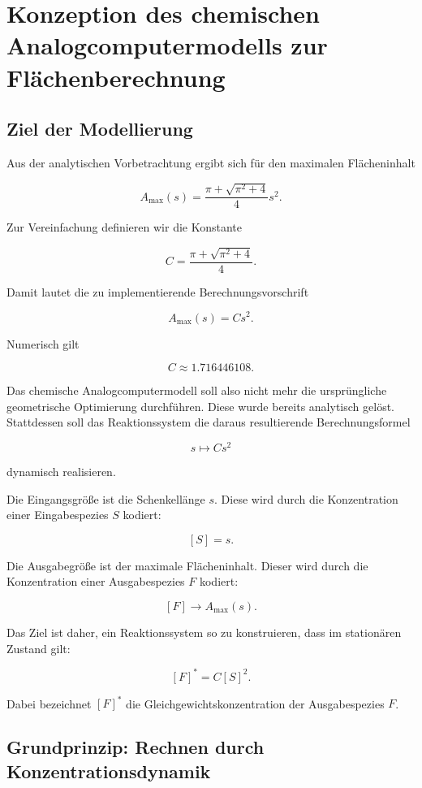 \section{Konzeption des chemischen Analogcomputermodells zur Flächenberechnung}

\subsection{Ziel der Modellierung}

Aus der analytischen Vorbetrachtung ergibt sich für den maximalen
Flächeninhalt

\[
A_{\max}(s)
=
\frac{\pi+\sqrt{\pi^2+4}}{4}s^2.
\]

Zur Vereinfachung definieren wir die Konstante

\[
C
=
\frac{\pi+\sqrt{\pi^2+4}}{4}.
\]

Damit lautet die zu implementierende Berechnungsvorschrift

\[
A_{\max}(s)=C s^2.
\]

Numerisch gilt

\[
C \approx 1.716446108.
\]

Das chemische Analogcomputermodell soll also nicht mehr die ursprüngliche
geometrische Optimierung durchführen. Diese wurde bereits analytisch
gelöst. Stattdessen soll das Reaktionssystem die daraus resultierende
Berechnungsformel

\[
s \mapsto C s^2
\]

dynamisch realisieren.

Die Eingangsgröße ist die Schenkellänge \(s\). Diese wird durch die
Konzentration einer Eingabespezies \(S\) kodiert:

\[
[S]=s.
\]

Die Ausgabegröße ist der maximale Flächeninhalt. Dieser wird durch die
Konzentration einer Ausgabespezies \(F\) kodiert:

\[
[F]\longrightarrow A_{\max}(s).
\]

Das Ziel ist daher, ein Reaktionssystem so zu konstruieren, dass im
stationären Zustand gilt:

\[
[F]^*
=
C[S]^2.
\]

Dabei bezeichnet \([F]^*\) die Gleichgewichtskonzentration der
Ausgabespezies \(F\).

\subsection{Grundprinzip: Rechnen durch Konzentrationsdynamik}

